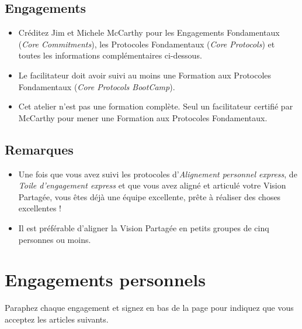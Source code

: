 \documentclass[11pt]{book}
\let\oldsection\section
\renewcommand\section{\clearpage\oldsection}
\begin{document}
\subsection{Engagements}
\begin{itemize}
	\item Créditez Jim et Michele McCarthy pour les Engagements Fondamentaux (\emph{Core Commitments}), les Protocoles Fondamentaux (\emph{Core Protocols}) et toutes les
	      informations complémentaires ci-dessous.
	\item Le facilitateur doit avoir suivi au moins une Formation aux Protocoles Fondamentaux (\emph{Core Protocols BootCamp}). 
	\item Cet atelier n'est pas une formation complète. Seul un facilitateur certifié par McCarthy pour mener une Formation aux Protocoles Fondamentaux.
\end{itemize}

\subsection{Remarques}
\begin{itemize}
	\item Une fois que vous avez suivi les protocoles d'\emph{Alignement personnel express}, de \emph{Toile d'engagement express} et que vous avez aligné et articulé
	      votre Vision Partagée, vous êtes déjà une équipe excellente, prête à réaliser des choses excellentes !
	\item Il est préférable d'aligner la Vision Partagée en petits groupes de cinq personnes ou moins.
\end{itemize}

\section{Engagements personnels} \label{engagements-personnels}

Paraphez chaque engagement et signez en bas de la page pour indiquez que vous acceptez les articles suivants.
\end{document}

